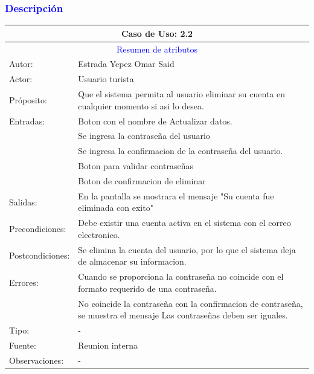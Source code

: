 \subsubsection{\textcolor{blue}{Descripción}}
\begin{tabularx}{16cm}{||l|X||}
	\hline
	\multicolumn{2}{||c||}{Caso de Uso: 2.2} \\
	\hline
	\multicolumn{2}{||c||}{\textcolor{blue}{Resumen de atributos}} \\
	\hline
	{Autor:} & Estrada Yepez Omar Said \\
    \hline
	{Actor:} & Usuario turista\\
	\hline
	{Próposito:} & Que el sistema permita al usuario eliminar su cuenta en cualquier momento si asi lo desea.\\
	\hline
	{Entradas:} &  Boton con el nombre de Actualizar datos. \\
    &Se ingresa la contraseña del usuario\\
    &Se ingresa la confirmacion de la contraseña del usuario.\\
    &Boton para validar contraseñas\\
    &Boton de confirmacion de eliminar\\
	\hline
	{Salidas:} & En la pantalla se mostrara el mensaje "Su cuenta fue eliminada con exito"\\
	\hline
	{Precondiciones:} & Debe existir una cuenta activa en el sistema con el correo electronico.\\ 
	\hline
	{Postcondiciones:} & Se elimina la cuenta del usuario, por lo que el sistema deja de almacenar su informacion.\\
	\hline
	{Errores:} & Cuando se proporciona la contraseña no coincide con el formato requerido de una contraseña. \\
    &No coincide la contraseña con la confirmacion de contraseña, se muestra el mensaje Las contraseñas deben ser iguales.\\
	\hline
	{Tipo:} & -\\
	\hline
	{Fuente:} & Reunion interna \\
	\hline
	{Observaciones:} & {-} \\
	\hline
\end{tabularx}

\pagebreak
